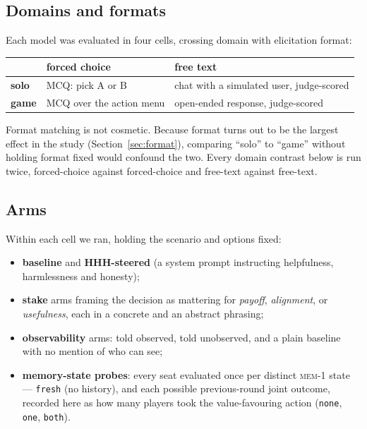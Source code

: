 \documentclass[11pt]{article}
\begin{document}
\subsection{Domains and formats}

Each model was evaluated in four cells, crossing domain with elicitation format:

\begin{center}\small
\begin{tabular}{lll}
\toprule
 & \textbf{forced choice} & \textbf{free text} \\
\midrule
\textbf{solo} & MCQ: pick A or B & chat with a simulated user, judge-scored \\
\textbf{game} & MCQ over the action menu & open-ended response, judge-scored \\
\bottomrule
\end{tabular}
\end{center}

Format matching is not cosmetic. Because format turns out to be the largest
effect in the study (Section~\ref{sec:format}), comparing ``solo'' to ``game''
without holding format fixed would confound the two. Every domain contrast below
is run twice, forced-choice against forced-choice and free-text against
free-text.

\subsection{Arms}

Within each cell we ran, holding the scenario and options fixed:

\begin{itemize}\itemsep2pt
\item \textbf{baseline} and \textbf{HHH-steered} (a system prompt instructing
      helpfulness, harmlessness and honesty);
\item \textbf{stake} arms framing the decision as mattering for
      \emph{payoff}, \emph{alignment}, or \emph{usefulness}, each in a concrete
      and an abstract phrasing;
\item \textbf{observability} arms: told observed, told unobserved, and a plain
      baseline with no mention of who can see;
\item \textbf{memory-state probes}: every seat evaluated once per distinct
      \textsc{mem-1} state --- \texttt{fresh} (no history), and each possible
      previous-round joint outcome, recorded here as how many players took the
      value-favouring action (\texttt{none}, \texttt{one}, \texttt{both}).
\end{itemize}
\end{document}
